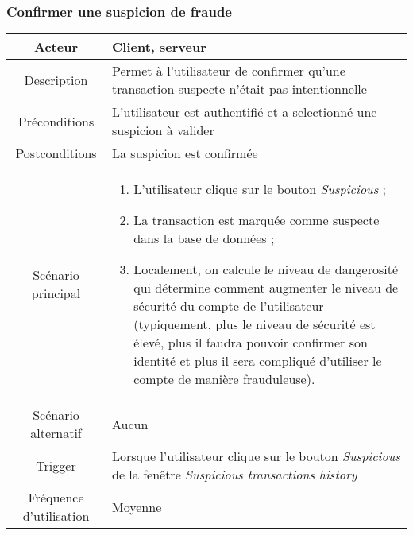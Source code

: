 \documentclass{article}
\begin{document}
\subsubsection{Confirmer une suspicion de fraude}
\begin{table}[h!]

\begin{tabular}{|c|p{11cm}|}
\hline
Acteur & Client, serveur \\
\hline
Description & Permet à l'utilisateur de confirmer qu'une transaction suspecte n'était pas intentionnelle \\
\hline
Préconditions & L'utilisateur est authentifié et a selectionné une suspicion à valider \\
\hline
Postconditions & La suspicion est confirmée \\
\hline
Scénario principal & \begin{enumerate}
\item L'utilisateur clique sur le bouton \emph{Suspicious} ;
\item La transaction est marquée comme suspecte dans la base de données ;
\item Localement, on calcule le niveau de dangerosité qui détermine comment augmenter le niveau de sécurité du compte de l'utilisateur (typiquement, plus le niveau de sécurité est élevé, plus il faudra pouvoir confirmer son identité et plus il sera compliqué d'utiliser le compte de manière frauduleuse).
\end{enumerate} \\
\hline
Scénario alternatif & Aucun \\
\hline
Trigger & Lorsque l'utilisateur clique sur le bouton \emph{Suspicious} de la fenêtre  \emph{Suspicious transactions history} \\
\hline
Fréquence d'utilisation & Moyenne \\
\hline
\end{tabular}

\end{table}


\newpage
\end{document}
